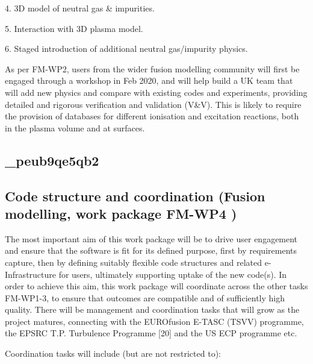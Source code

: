 \documentclass{article}
\begin{document}
\vspace{2pt}
4. 3D model of neutral gas \& impurities.

\vspace{2pt}
5. Interaction with 3D plasma model.

\vspace{2pt}
6. Staged introduction of additional neutral gas/impurity physics.

\vspace{14pt}
\leftskip=-14pt
As per FM-WP2, users from the wider fusion modelling community will first be engaged 
through a workshop in Feb 2020, and will help build a UK team that will add new 
physics and compare with existing codes and experiments, providing detailed and 
rigorous verification and validation (V\&V). This is likely to require the provision 
of databases for different ionisation and excitation reactions, both in the plasma 
volume and at surfaces.\label{}

\vspace{2pt}
\subsection*{{\color{color20} \textbf{\_peub9qe5qb2}}}

\vspace{2pt}
\subsection*{{\color{color25} \textbf{Code structure and coordination }}{\color{color25} (Fusion 
modelling, work package }{\color{color25} \textbf{FM-WP4}}{\color{color25} )}}

\vspace{14pt}
The most important aim of this work package will be to drive user engagement and 
ensure that the software is fit for its defined purpose, first by requirements 
capture, then by defining suitably flexible code structures and related e-Infrastructure 
for users, ultimately supporting uptake of the new code(s). In order to achieve 
this aim, this work package will coordinate across the other tasks FM-WP1-3, to 
ensure that outcomes are compatible and of sufficiently high quality. There will 
be management and coordination tasks that will grow as the project matures, {\color{color29} connecting 
with the EUROfusion E-TASC (TSVV) programme, the EPSRC T.P. Turbulence Programme 
[20] and the }US ECP programme etc.

\vspace{14pt}
Coordination tasks will include (but are not restricted to):
\end{document}
